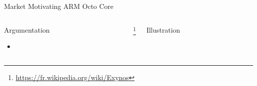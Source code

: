 %
\begin{Frame}{Market Motivating ARM Octo Core}
  \begin{columns}[t]
    \begin{column}{5cm} %
      \begin{block}{Argumentation}
        \begin{itemize}
        \item 
        \end{itemize}
      \end{block} 
    \end{column}
    \footnote{\url{https://fr.wikipedia.org/wiki/Exynos}}
    \begin{column}{5cm} %
      \begin{block}{Illustration}
      \end{block}   
    \end{column}
  \end{columns}  
\end{Frame}



